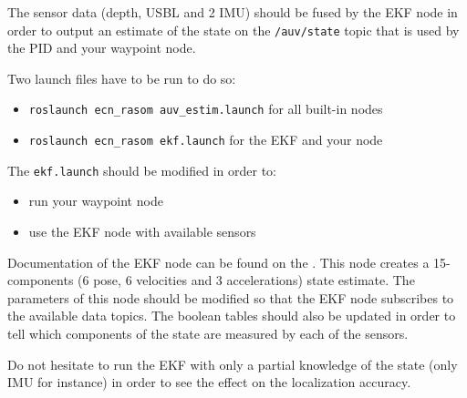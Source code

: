 \documentclass{ecnreport}
\begin{document}
The sensor data (depth, USBL and 2 IMU) should be fused by the EKF node in order to output an estimate of the state on the \texttt{/auv/state} topic that is used by the PID and your waypoint node.

Two launch files have to be run to do so:
\begin{itemize}
 \item \texttt{roslaunch ecn\_rasom auv\_estim.launch} for all built-in nodes
 \item \texttt{roslaunch ecn\_rasom ekf.launch} for the EKF and your node
\end{itemize}

The \texttt{ekf.launch} should be modified in order to:
\begin{itemize}
 \item run your waypoint node
 \item use the EKF node with available sensors
\end{itemize}
Documentation of the EKF node can be found on the .
This node creates a 15-components (6 pose, 6 velocities and 3 accelerations) state estimate.
The parameters of this node should be modified so that the EKF node
subscribes to the available data topics. The boolean tables should
also be updated in order to tell which components of the state are measured by each of the sensors. 

Do not hesitate to run the EKF with only a partial knowledge of the state (only IMU for instance) in order to see the effect on the localization accuracy.
\end{document}
